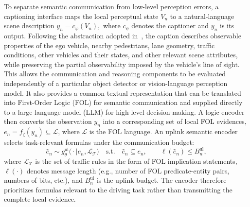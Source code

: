 \documentclass[10pt, conference, letterpaper]{ IEEEtran}
\theoremstyle{bfnote}
\newcommand{\Language}{\mathcal{L}} %
\begin{document}
To separate semantic communication from low-level perception errors, a captioning interface maps the local perceptual state $V_n$ to a natural-language scene description $ y_n=c_{\psi}(V_n), $ where $c_{\psi}$ denotes the captioner and $y_n$ is its output. Following the abstraction adopted in~\cite{Cui2025CoopReflectTN}, the caption describes observable properties of the ego vehicle, nearby pedestrians, lane geometry, traffic conditions, other vehicles and their states, and other relevant scene attributes, while preserving the partial observability imposed by the vehicle's line of sight. This allows the communication and reasoning components to be evaluated independently of a particular object detector or vision-language perception model. It also provides a common textual representation that can be translated into First-Order Logic (FOL) for semantic communication  and supplied directly to a large language model (LLM) for high-level decision-making. A logic encoder then converts the observation $y_n$ into a corresponding set of local FOL evidences, $ e_n=f_{\zeta}(y_n)\subseteq\mathcal{L}$, where $\Language$ is the FOL language.
An uplink semantic encoder selects task-relevant formulas under the
communication budget:
\begin{equation}
\label{eq:uplink-selection}
\hat e_n
\sim
g_{\theta}^{\mathrm{ul}}
\bigl(\cdot\mid e_n,\mathcal{L}_{\mathcal T}\bigr)
\quad
\text{s.t.}
\quad
\hat e_n\subseteq e_n,
\qquad
\ell(\hat e_n)\leq B_n^{\mathrm{ul}},
\end{equation}
where $\mathcal{L}_{\mathcal T}$ is the set of traffic rules in the form of FOL implication statements,
$\ell(\cdot)$ denotes message length (e.g., number of FOL predicate-entity pairs, numbers of bits, etc.), and $B_n^{\mathrm{ul}}$ is the
uplink budget. The encoder therefore prioritizes formulas relevant to the
driving task rather than transmitting the complete local evidence.
\end{document}
